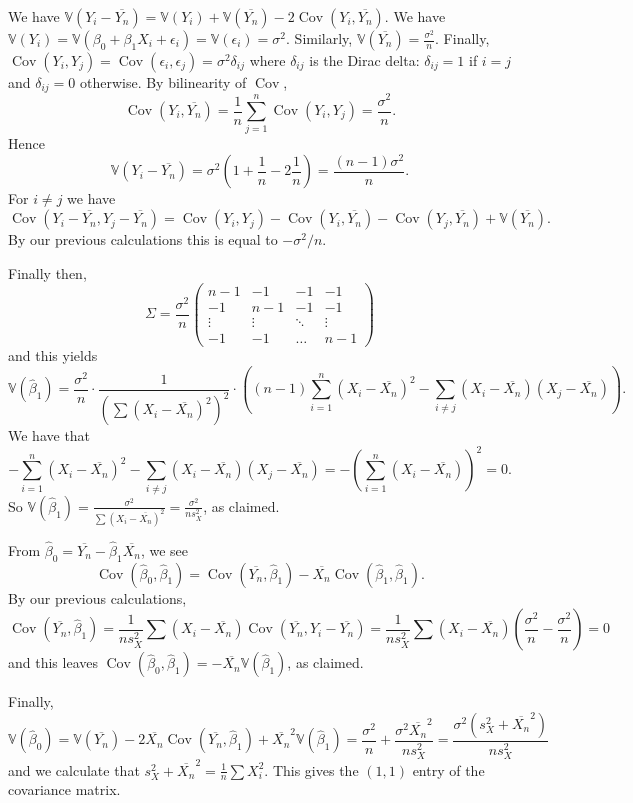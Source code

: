 \documentclass[10pt]{article}
\newcommand{\V}{\mathbb{V}}
\newcommand{\Cov}{\operatorname{Cov}}
\begin{document}
\begin{enumerate}
We have $\V(Y_i - \overline{Y_n})=
\V(Y_i) + \V(\overline{Y_n}) - 2\Cov(Y_i,\overline{Y_n})$.
We have $\V(Y_i)=\V(\beta_0+\beta_1X_i+\epsilon_i)=\V(\epsilon_i)=\sigma^2$.
Similarly, $\V(\overline{Y_n})=\frac{\sigma^2}{n}$. Finally,
$\Cov(Y_i,Y_j)=\Cov(\epsilon_i,\epsilon_j)=\sigma^2 \delta_{ij}$
where $\delta_{ij}$ is the Dirac delta: $\delta_{ij}=1$ if $i=j$ and
$\delta_{ij}=0$ otherwise.
By bilinearity of $\Cov$,
\[
\Cov(Y_i,\overline{Y_n}) = \frac{1}{n} \sum_{j=1}^n \Cov(Y_i,Y_j)=\frac{\sigma^2}{n}.
\]
Hence
\[
\V(Y_i-\overline{Y_n}) = \sigma^2\left(1+\frac{1}{n} - 2\frac{1}{n}\right) =
\frac{(n-1)\sigma^2}{n}.
\]
For $i\neq j$ we have
\[
\Cov(Y_i - \overline{Y_n}, Y_j - \overline{Y_n}) =
\Cov(Y_i, Y_j) - \Cov(Y_i, \overline{Y_n}) - \Cov(Y_j, \overline{Y_n}) +
\V(\overline{Y_n}).
\]
By our previous calculations this is equal to $-\sigma^2/n$.

Finally then,
\[
\Sigma = \frac{\sigma^2}{n}\begin{pmatrix}
n-1 & -1 & -1 & -1 \\
-1 & n-1 & -1 & -1 \\
\vdots & \vdots  & \ddots & \vdots \\
-1 & -1 & \ldots & n-1
\end{pmatrix}
\]
and this yields
\[
\V(\hat \beta_1) = \frac{\sigma^2}{n} \cdot
\frac{1}{\left(\sum (X_i - \overline{X_n})^2\right)^2} \cdot
\left((n-1)\sum_{i=1}^n (X_i - \overline{X_n})^2 - \sum_{i\neq j}
(X_i-\overline{X_n})(X_j-\overline{X_n})\right).
\]
We have that
\[
-\sum_{i=1}^n (X_i - \overline{X_n})^2 -
\sum_{i\neq j}(X_i-\overline{X_n})(X_j-\overline{X_n}) =
- \left(\sum_{i=1}^n (X_i-\overline{X_n})\right)^2 = 0.
\]
So
$\V(\hat \beta_1)=\frac{\sigma^2}{\sum (X_i-\overline{X_n})^2}=\frac{\sigma^2}{ns_X^2}$,
as claimed.

From $\hat \beta_0 = \overline{Y_n} - \hat \beta_1 \overline{X_n}$, we see
\[
\Cov(\hat \beta_0, \hat \beta_1) = \Cov(\overline{Y_n},\hat \beta_1) -
\overline{X_n} \Cov(\hat \beta_1, \hat \beta_1).
\]
By our previous calculations,
\[
\Cov(\overline{Y_n},\hat\beta_1) = \frac{1}{n s_X^2} \sum (X_i-\overline{X_n})
\Cov(\overline{Y_n}, Y_i-\overline{Y_n}) = \frac{1}{n s_X^2}
\sum (X_i - \overline{X_n})\left(\frac{\sigma^2}{n} - \frac{\sigma^2}{n}\right)
= 0
\]
and this leaves $\Cov(\hat \beta_0, \hat \beta_1) = -\overline{X_n} \V(\hat \beta_1)$,
as claimed.

Finally,
\[
\V(\hat \beta_0) = \V(\overline{Y_n}) -
2 \overline{X_n} \Cov(\overline{Y_n}, \hat \beta_1) + \overline{X_n}^2\V(\hat \beta_1)
= \frac{\sigma^2}{n} + \frac{\sigma^2 \overline{X_n}^2}{ns_X^2} =
\frac{\sigma^2(s_X^2 + \overline{X_n}^2)}{ns_X^2}
\]
and we calculate that $s_X^2+\overline{X_n}^2=\frac{1}{n}\sum X_i^2$.
This gives the $(1,1)$ entry of the covariance matrix.


\end{enumerate}
\end{document}
